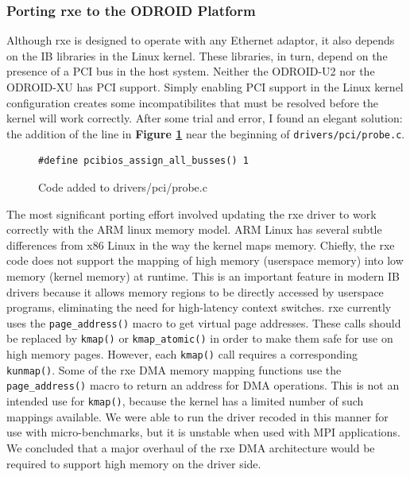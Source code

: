\documentclass[a4paper]{article}
\begin{document}
\subsubsection{\textbf{Porting rxe to the ODROID Platform}}


Although rxe is designed to operate with any Ethernet adaptor, it also depends
on the IB libraries in the Linux kernel. These libraries, in turn, depend on the
presence of a PCI bus in the host system. Neither the ODROID-U2 nor the
ODROID-XU has PCI support. Simply enabling PCI support in the Linux kernel
configuration creates some incompatibilites that must be resolved before the
kernel will work correctly. After some trial and error, I found an elegant
solution: the addition of the line in \textbf{Figure \ref{pci_code}} near the
beginning of \verb;drivers/pci/probe.c;.

\begin{figure}[h]
\begin{verbatim}
#define pcibios_assign_all_busses() 1
\end{verbatim}
\caption{Code added to drivers/pci/probe.c}
\label{pci_code}
\end{figure}

The most significant porting effort involved updating the rxe driver to work
correctly with the ARM linux memory model. ARM Linux has several subtle
differences from x86 Linux in the way the kernel maps memory. Chiefly, the rxe
code does not support the mapping of high memory (userspace memory) into low
memory (kernel memory) at runtime. This is an important feature in modern IB
drivers because it allows memory regions to be directly accessed by userspace
programs, eliminating the need for high-latency context switches. rxe currently
uses the \verb;page_address(); macro to get virtual page addresses. These calls
should be replaced by \verb;kmap(); or \verb;kmap_atomic(); in order to make
them safe for use on high memory pages. However, each \verb;kmap(); call
requires a corresponding \verb;kunmap();. Some of the rxe DMA memory mapping
functions use the \verb;page_address(); macro to return an address for DMA
operations. This is not an intended use for \verb;kmap();, because the kernel
has a limited number of such mappings available. We were able to run the driver
recoded in this manner for use with micro-benchmarks, but it is unstable when
used with MPI applications. We concluded that a major overhaul of the rxe DMA
architecture would be required to support high memory on the driver side.
\end{document}
